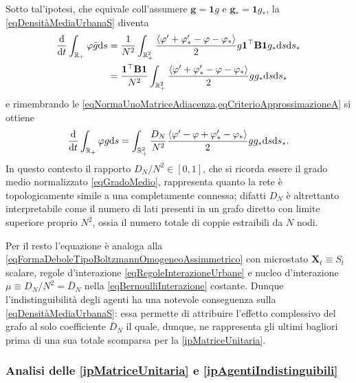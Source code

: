         Sotto tal'ipotesi, che equivale coll'assumere \(\mathbf g=\mathbf1g\) e \(\mathbf g_*=\mathbf1g_*\), la \ref{eqDensitàMediaUrbanaS} diventa
        \begin{equation*}
          \begin{aligned}
            \frac{\mathrm{d}}{\mathrm{d}t}\int_{\mathbb R_+}\varphi\bar g\mathrm{d} s
            &=\frac1{N^2}\int_{\mathbb R_+^2}
            \frac{\langle\varphi'+\varphi'_*-\varphi-\varphi_*\rangle}2
            g\mathbf1^\top\mathbf B\mathbf1g_*\mathrm{d} s\mathrm{d} s_*\\
            &=\frac{\mathbf1^\top\textbf B\mathbf1}{N^2}\int_{\mathbb R_+^2}
            \frac{\langle\varphi'+\varphi'_*-\varphi-\varphi_*\rangle}2
            gg_*\mathrm{d} s\mathrm{d} s_*
          \end{aligned}
        \end{equation*}
        e rimembrando le \cref{eqNormaUnoMatriceAdiacenza,eqCriterioApprossimazioneA} si ottiene
        \begin{equation}
          \label{eqTipoBoltzmannConAgentiIndistinguibili}
          \frac{\mathrm{d}}{\mathrm{d}t}\int_{\mathbb R_+}\varphi g\mathrm{d} s=
          \int_{\mathbb R_+^2}\frac{D_N}{N^2}
          \frac{\langle\varphi'-\varphi+\varphi'_*-\varphi_*\rangle}2
          gg_*\mathrm{d} s\mathrm{d} s_*.
        \end{equation}
        In questo contesto il rapporto \(D_N/N^2\in[0,1]\), che si ricorda essere il grado medio normalizzato \cref{eqGradoMedio}, rappresenta quanto la rete è topologicamente simile a una completamente connessa; difatti \(D_N\) è altrettanto interpretabile come il numero di lati presenti in un grafo diretto con limite superiore proprio \(N^2\), ossia il numero totale di coppie estraibili da \(N\) nodi.%
        
        Per il resto l'equazione è analoga alla \ref{eqFormaDeboleTipoBoltzmannOmogeneoAssimmetrico} con microstato \(\mathbf X_t\equiv S_t\) scalare, regole d'interazione \ref{eqRegoleInterazioneUrbane} e nucleo d'interazione \(\mu\equiv D_N/N^2=\bar D_N\) nella \ref{eqBernoulliInterazione} costante. Dunque l'indistinguibilità degli agenti ha una notevole conseguenza sulla \ref{eqDensitàMediaUrbanaS}: essa permette di attribuire l'effetto complessivo del grafo al solo coefficiente \(\bar D_N\) il quale, dunque, ne rappresenta gli ultimi bagliori prima di una sua totale scomparsa per la \ref{ipMatriceUnitaria}.

      \subsubsection{Analisi delle \texorpdfstring{\ref{ipMatriceUnitaria} e \ref{ipAgentiIndistinguibili}}{S1 e S2}}

